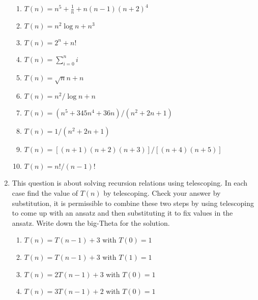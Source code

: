 \documentclass[11pt,a4paper]{scrartcl}
\newif\ifanswers
\begin{document}
\begin{enumerate}
\begin{enumerate}

\item $T(n)=n^5+\frac{1}{n}+n(n-1)(n+2)^4$
\item $T(n)=n^2\log{n}+n^3$
\item $T(n)=2^n+n!$
\item $T(n)=\sum_{i=0}^ni$
\item $T(n)=\sqrt{n}n+n$
\item $T(n)=n^2/\log{n}+n$
\item $T(n)=(n^5+345n^4+36n)/(n^2+2n+1)$
\item $T(n)=1/(n^2+2n+1)$
\item $T(n)=[(n+1)(n+2)(n+3)]/[(n+4)(n+5)]$
\item $T(n)=n!/(n-1)!$
\end{enumerate}

\ifanswers 

\noindent Solution: So just take the leading term in $n$ each time

\begin{enumerate}

\item $\Theta(n^5)$
\item $\Theta(n^2\log{n})$
\item $\Theta(n!)$
\item $\Theta(n^2)$
\item $\Theta(\sqrt{n}n)$
\item $\Theta(n^2/\log{n})$
\item $\Theta(n^3)$
\item $\Theta(1)$
\item $\Theta(n)$
\item $\Theta(n)$
\end{enumerate}
\fi


\newpage

\item This question is about solving recursion relations using
  telescoping. In each case find the value of $T(n)$ by
  telescoping. Check your answer by substitution, it is permissible
  to combine these two steps by using telescoping to come up with an
  ansatz and then substituting it to fix values in the ansatz. Write down
  the big-Theta for the solution.

\begin{enumerate}
\item $T(n)=T(n-1)+3$ with $T(0)=1$
\item $T(n)=T(n-1)+3$ with $T(1)=1$
\item $T(n)=2T(n-1)+3$ with $T(0)=1$
\item $T(n)=3T(n-1)+2$ with $T(0)=1$
\end{enumerate}


\end{enumerate}
\end{document}
